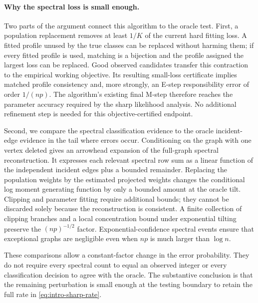 \documentclass[11pt]{article}
\theoremstyle{definition}
\theoremstyle{remark}
\numberwithin{equation}{section}
\begin{document}
\paragraph{Why the spectral loss is small enough.}
Two parts of the argument connect this algorithm to the oracle test. First, a population replacement removes at least $1/K$ of the current hard fitting loss. A fitted profile unused by the true classes can be replaced without harming them; if every fitted profile is used, matching is a bijection and the profile assigned the largest loss can be replaced. Good observed candidates transfer this contraction to the empirical working objective. Its resulting small-loss certificate implies matched profile consistency and, more strongly, an E-step responsibility error of order $1/(np)$. The algorithm's existing final M-step therefore reaches the parameter accuracy required by the sharp likelihood analysis. No additional refinement step is needed for this objective-certified endpoint.

Second, we compare the spectral classification evidence to the oracle incident-edge evidence in the tail where errors occur. Conditioning on the graph with one vertex deleted gives an arrowhead expansion of the full-graph spectral reconstruction. It expresses each relevant spectral row sum as a linear function of the independent incident edges plus a bounded remainder. Replacing the population weights by the estimated projected weights changes the conditional log moment generating function by only a bounded amount at the oracle tilt. Clipping and parameter fitting require additional bounds; they cannot be discarded solely because the reconstruction is consistent. A finite collection of clipping branches and a local concentration bound under exponential tilting preserve the $(np)^{-1/2}$ factor. Exponential-confidence spectral events ensure that exceptional graphs are negligible even when $np$ is much larger than $\log n$.

These comparisons allow a constant-factor change in the error probability. They do not require every spectral count to equal an observed integer or every classification decision to agree with the oracle. The substantive conclusion is that the remaining perturbation is small enough at the testing boundary to retain the full rate in \eqref{eq:intro-sharp-rate}.
\end{document}
